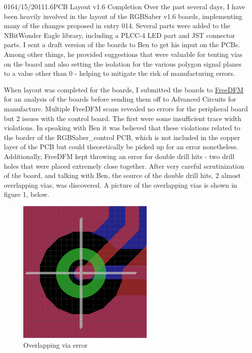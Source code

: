 \documentclass[12pt,letterpaper,onecolumn]{article}
\begin{document}
\begin{nbentry}{016}{4/15/2011}{1.6}{PCB Layout v1.6 Completion}
\indent Over the past several days, I have been heavily involved in the layout of the RGBSaber v1.6 boards, implementing many of the changes proposed in entry 014. Several parts were added to the NBitWonder Eagle library, including a PLCC-4 LED part and JST connector parts. I sent a draft version of the boards to Ben to get his input on the PCBs. Among other things, he provided suggestions that were valuable for tenting vias on the board and also setting the isolation for the various polygon signal planes to a value other than 0 - helping to mitigate the risk of manufacturing errors.

\indent When layout was completed for the boards, I submitted the boards to \href{http://freedfm.com}{FreeDFM} for an analysis of the boards before sending them off to Advanced Circuits for manufacture. Multiple FreeDFM scans revealed no errors for the peripheral board but 2 issues with the control board. The first were some insufficient trace width violations. In speaking with Ben it was believed that these violations related to the border of the RGBSaber\_control PCB, which is not included in the copper layer of the PCB but could theoretically be picked up for an error nonetheless. Additionally, FreeDFM kept throwing an error for double drill hits - two drill holes that were placed extremely close together. After very careful scrutinization of the board, and talking with Ben, the source of the double drill hits, 2 almost overlapping vias, was discovered. A picture of the overlapping vias is shown in figure 1, below.
\begin{figure}[hbp]
\begin{center}
\includegraphics[width=0.6\textwidth]{img/DoubleDrillVia.png}
\end{center}
\caption{Overlapping via error}
\label{fig: doubledrill}
\end{figure}


\end{nbentry}
\end{document}
